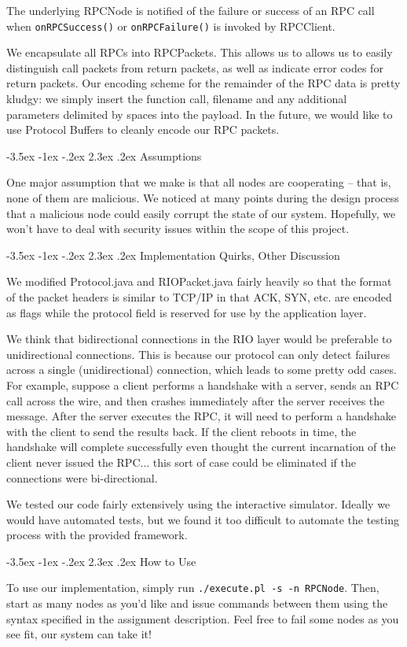 \documentclass[12pt]{article}	%
\makeatletter
\renewcommand\section{\@startsection{section}{1}{\z@}%
                                 {-3.5ex \@plus -1ex \@minus -.2ex}%
                                 {2.3ex \@plus.2ex}%
                                 {\normalfont\large\bfseries}}
\makeatother
\begin{document}
The underlying RPCNode is notified of the failure or success of an RPC call when {\tt onRPCSuccess()} or {\tt onRPCFailure()} is invoked by RPCClient.

We encapsulate all RPCs into RPCPackets. This allows us to allows us to easily distinguish call packets from return packets, as well as indicate error codes for return packets. Our encoding scheme for the remainder of the RPC data is pretty kludgy: we simply insert the function call, filename and any additional parameters delimited by spaces into the payload. In the future, we would like to use Protocol Buffers to cleanly encode our RPC packets.

\section{Assumptions}

One major assumption that we make is that all nodes are cooperating -- that is, none of them are malicious. We noticed at many points during the design process that a malicious node could easily corrupt the state of our system. Hopefully, we won't have to deal with security issues within the scope of this project.

\section{Implementation Quirks, Other Discussion}

We modified Protocol.java and RIOPacket.java fairly heavily so that the format of the packet headers is similar to TCP/IP in that ACK, SYN, etc. are encoded as flags while the protocol field is reserved for use by the application layer. 

We think that bidirectional connections in the RIO layer would be preferable to unidirectional connections. This is because our protocol can only detect failures across a single (unidirectional) connection, which leads to some pretty odd cases. For example, suppose a client performs a handshake with a server, sends an RPC call across the wire, and then crashes immediately after the server receives the message. After the server executes the RPC, it will need to perform a handshake with the client to send the results back. If the client reboots in time, the handshake will complete successfully even thought the current incarnation of the client never issued the RPC... this sort of case could be eliminated if the connections were bi-directional.

We tested our code fairly extensively using the interactive simulator. Ideally we would have automated tests, but we found it too difficult to automate the testing process with the provided framework.

\section{How to Use}

To use our implementation, simply run {\tt ./execute.pl -s -n RPCNode}. Then, start as many nodes as you'd like and issue commands between them using the syntax specified in the assignment description. Feel free to fail some nodes as you see fit, our system can take it!
\end{document}
